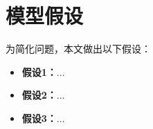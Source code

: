 \section{模型假设}

为简化问题，本文做出以下假设：

\begin{itemize}[itemindent=2em]
\item \textbf{假设1：}...
\item \textbf{假设2：}...
\item \textbf{假设3：}...
\end{itemize}
